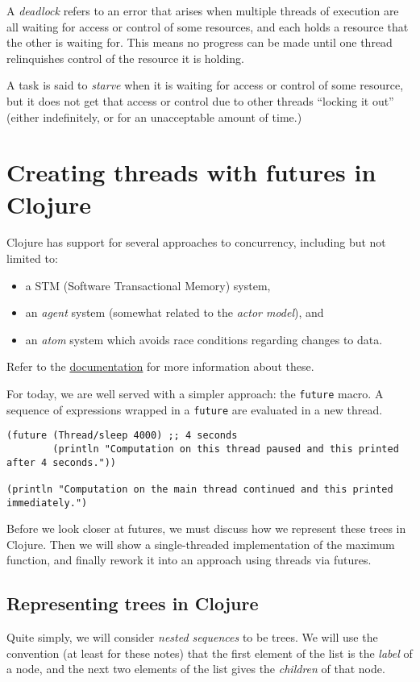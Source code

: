 \documentclass[11pt]{article}
\begin{document}
A \emph{deadlock} refers to an error that arises when
multiple threads of execution are all waiting for access
or control of some resources, and each holds
a resource that the other is waiting for.
This means no progress can be made until one thread
relinquishes control of the resource it is holding.

A task is said to \emph{starve} when it is waiting for
access or control of some resource, but it does not
get that access or control due to other threads “locking it out”
(either indefinitely, or for an unacceptable amount of time.)

\section{Creating threads with futures in Clojure}
\label{sec:org8014d37}
Clojure has support for several approaches to concurrency,
including but not limited to:
\begin{itemize}
\item a STM (Software Transactional Memory) system,
\item an \emph{agent} system (somewhat related to the \emph{actor model}), and
\item an \emph{atom} system which avoids race conditions
regarding changes to data.
\end{itemize}
Refer to the \href{https://clojure.org/about/concurrent\_programming}{documentation}
for more information about these.

For today, we are well served with a simpler approach:
the \texttt{future} macro.
A sequence of expressions wrapped in a \texttt{future} are evaluated in
a new thread.
\begin{verbatim}
(future (Thread/sleep 4000) ;; 4 seconds
        (println "Computation on this thread paused and this printed after 4 seconds."))

(println "Computation on the main thread continued and this printed immediately.")
\end{verbatim}

Before we look closer at futures,
we must discuss how we represent these trees in Clojure.
Then we will show a single-threaded implementation of the maximum
function, and finally rework it into an approach using threads via futures.

\subsection{Representing trees in Clojure}
\label{sec:orgad2c451}
Quite simply, we will consider \emph{nested sequences} to be trees.
We will use the convention (at least for these notes)
that the first element of the list is the \emph{label} of a node,
and the next two elements of the list gives the \emph{children} of that node.
\end{document}
